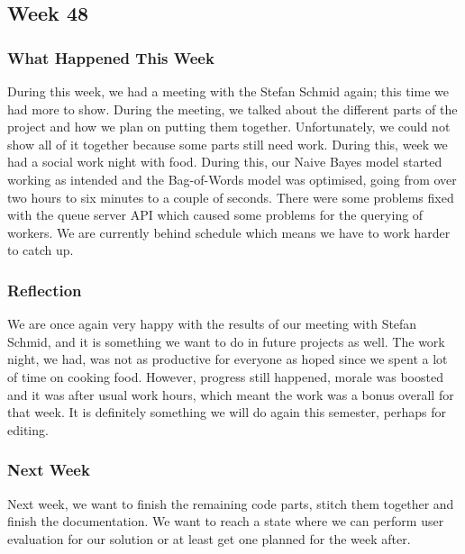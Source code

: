 \subsection{Week 48} 
\subsubsection{What Happened This Week}
During this week, we had a meeting with the Stefan Schmid again; this time
we had more to show. During the meeting, we talked about the different parts of the
project and how we plan on putting them together. Unfortunately, we could not
show all of it together because some parts still need work.
During this, week we had a social work night with food. During this, our Naive
Bayes model started working as intended and the Bag-of-Words model was
optimised, going from over two hours to six minutes to a couple of
seconds.
There were some problems fixed with the queue server \ac{API} which caused some problems for
the querying of workers. We are currently behind schedule which means we have to
work harder to catch up.

\subsubsection{Reflection}
We are once again very happy with the results of our meeting with Stefan
Schmid, and it is something we want to do in future projects as well. The work
night, we had, was not as productive for everyone as hoped since we spent a
lot of time on cooking food. However, progress still happened, morale was
boosted and it was after usual work hours, which meant the work was a
bonus overall for that week. It is definitely something we will do again this
semester, perhaps for editing. 

\subsubsection{Next Week}
Next week, we want to finish the remaining code parts, stitch them together and
finish the documentation. We want to reach a state where we can perform user
evaluation for our solution or at least get one planned for the week after.


